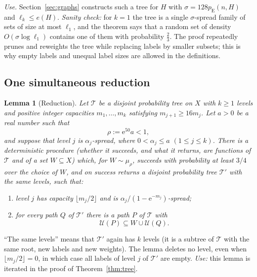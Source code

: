 \documentclass[11pt]{article}
\newtheorem{lemma}[theorem]{Lemma}
\numberwithin{equation}{section}
\newcommand{\pE}{p_{\mathrm E}}
\newcommand{\TT}{\mathcal T}
\newcommand{\UU}{\mathcal U}
\newcommand{\ee}{\mathrm e}
\begin{document}
\emph{Use.} Section~\ref{sec:graphs} constructs such a tree for $H$
with $\sigma=128\pE(n,H)$ and $\ell_k\le e(H)$. \emph{Sanity check:} for
$k=1$ the tree is a single $\sigma$-spread family of sets of size at
most $\ell_1$, and the theorem says that a random set of density
$O(\sigma\log\ell_1)$ contains one of them with probability
$\frac23$. The proof repeatedly prunes and reweights the tree while
replacing labels by smaller subsets; this is why empty labels and
unequal label sizes are allowed in the definitions.

\subsection{One simultaneous reduction}

\begin{lemma}[Reduction]\label{lem:reduction}
Let $\TT$ be a disjoint probability tree on $X$ with $k\ge1$ levels and
positive integer capacities $m_1,\ldots,m_k$ satisfying
$m_{j+1}\ge16m_j$. Let $a>0$ be a real number such that
\[
 \rho:=\ee^{50}a<1,
\]
and suppose that level $j$ is $\alpha_j$-spread, where
$0<\alpha_j\le a$ $(1\le j\le k)$.
There is a deterministic procedure (whether it succeeds, and what it
returns, are functions of $\TT$ and of a set $W\subseteq X$) which, for
$W\sim\mu_\rho$, succeeds with probability at least $3/4$ over the
choice of $W$, and on success returns a disjoint probability tree
$\TT'$ with the same levels, such that:
\begin{enumerate}[label=(\roman*),leftmargin=2.2em,itemsep=3pt]
 \item level $j$ has capacity $\lfloor m_j/2\rfloor$ and is
 $\alpha_j/(1-\ee^{-m_j})$-spread;
 \item for every path $Q$ of $\TT'$ there is a path $P$ of $\TT$ with
 \begin{equation}\label{eq:recovery}
   \UU(P)\subseteq W\cup\UU(Q).
 \end{equation}
\end{enumerate}
\end{lemma}

``The same levels'' means that $\TT'$ again has $k$ levels (it is a
subtree of $\TT$ with the same root, new labels and new weights). The
lemma deletes no level, even when $\lfloor m_j/2\rfloor=0$, in which
case all labels of level $j$ of $\TT'$ are empty. \emph{Use:} this
lemma is iterated in the proof of Theorem~\ref{thm:tree}.
\end{document}
